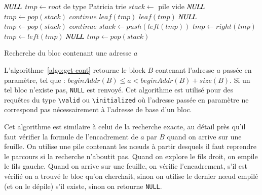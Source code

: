 \begin{algorithm}
\begin{algorithmic}
  \Return $\mathit{NULL}$
\Else
  \State $\mathit{tmp} \gets \mathit{root}$ de type Patricia trie
  \State $\mathit{stack} \gets$ pile vide
          \Return $\mathit{NULL}$
        \Else
          \State $\mathit{tmp} \gets \mathit{pop(stack)}$
          \State $\mathit{continue}$
        \EndIf
        \Return $\mathit{leaf(tmp)}$
        \Return $\mathit{leaf(tmp)}$
        \Return $\mathit{NULL}$
      \Else
        \State $\mathit{tmp} \gets \mathit{pop(stack)}$
        \State $\mathit{continue}$
      \EndIf
    \EndIf
      \State $\mathit{stack} \gets \mathit{push(left(tmp))}$
      \State $\mathit{tmp} \gets \mathit{right(tmp)}$
      \State $\mathit{tmp} \gets \mathit{left(tmp)}$
      \Return $\mathit{NULL}$
    \Else
      \State $\mathit{tmp} \gets \mathit{pop(stack)}$
    \EndIf
  \EndWhile
\EndIf
\end{algorithmic}
\caption{Recherche du bloc contenant une adresse $a$
  \label{algo:get-cont}}
\end{algorithm}

L'algorithme~\ref{algo:get-cont} retourne le block $B$ contenant
l'adresse $a$ passée en paramètre, tel que :
$beginAddr(B) \le a < beginAddr(B) + size(B)$.
Si un tel bloc n'existe pas, \lstinline{NULL} est renvoyé.
Cet algorithme est utilisé pour des requêtes du type \lstinline{\valid} ou
\lstinline{\initialized} où l'adresse passée en paramètre ne correspond pas
nécessairement à l'adresse de base d'un bloc.

Cet algorithme est similaire à celui de la recherche exacte, au détail près
qu'il faut vérifier la formule de l'encadrement de $a$ par $B$ quand on arrive
sur une feuille.
On utilise une pile contenant les n\oe{}uds à partir desquels il faut reprendre
le parcours si la recherche n'aboutit pas.
Quand on explore le fils droit, on empile le fils gauche.
Quand on arrive sur une feuille, on vérifie l'encadrement, s'il est vérifié on
a trouvé le bloc qu'on cherchait, sinon on utilise le dernier n\oe{}ud empilé
(et on le dépile) s'il existe, sinon on retourne \lstinline{NULL}.


